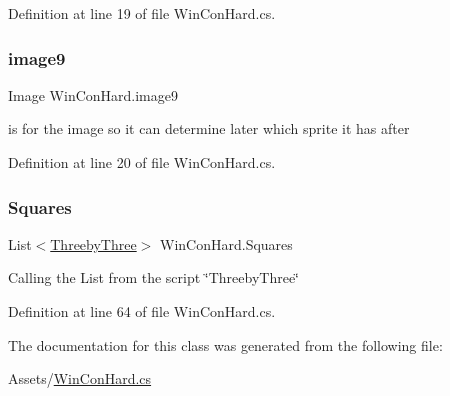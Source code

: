 Definition at line 19 of file Win\+Con\+Hard.\+cs.

\mbox{\label{class_win_con_hard_ad8bd277cfe6419b99eea50ea2b991eec}} 
\subsubsection{\texorpdfstring{image9}{image9}}
{\footnotesize\ttfamily Image Win\+Con\+Hard.\+image9}

is for the image so it can determine later which sprite it has after 

Definition at line 20 of file Win\+Con\+Hard.\+cs.

\mbox{\label{class_win_con_hard_a58fc7d56cc69a33e6dcee18e5bda4622}} 
\subsubsection{\texorpdfstring{Squares}{Squares}}
{\footnotesize\ttfamily List$<$\mbox{\hyperlink{class_threeby_three}{Threeby\+Three}}$>$ Win\+Con\+Hard.\+Squares}

Calling the List from the script \char`\"{}\+Threeby\+Three\char`\"{} 

Definition at line 64 of file Win\+Con\+Hard.\+cs.



The documentation for this class was generated from the following file\+:\begin{DoxyCompactItemize}
\item 
Assets/\mbox{\hyperlink{_win_con_hard_8cs}{Win\+Con\+Hard.\+cs}}\end{DoxyCompactItemize}
